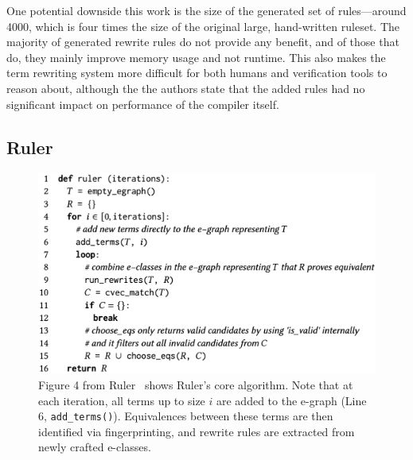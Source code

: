 \documentclass[acmsmall,screen,nonacm]{acmart}
\begin{document}
One potential downside this work is the size of the generated set of rules---around 4000, which is four times the size of the original large, hand-written ruleset. The majority of generated rewrite rules do not provide any benefit, and of those that do, they mainly improve memory usage and not runtime. This also makes the term rewriting system more difficult for both humans and verification tools to reason about, although the the authors state that the added rules had no significant impact on performance of the compiler itself.

\subsection{Ruler}
\label{sec:ruler}

\begin{figure}[htbp]
\centering
\includegraphics[scale=0.5,trim=0cm 0cm 0cm 0cm, clip]{figs/ruler_algo.png}
\caption{Figure 4 from Ruler~\cite{nandi2021ruler} shows Ruler's core algorithm. Note that at each iteration, all terms up to size $i$ are added to the e-graph (Line 6, \texttt{add\_terms()}). Equivalences between these terms are then identified via fingerprinting, and rewrite rules are extracted from newly crafted e-classes.}
\label{fig:ruler_algo}
\end{figure}
\end{document}
